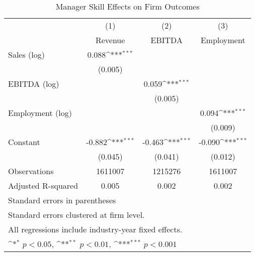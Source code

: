 \begin{table}[htbp]\centering
\def\sym#1{\ifmmode^{#1}\else\(^{#1}\)\fi}
\caption{Manager Skill Effects on Firm Outcomes}
\begin{tabular}{l*{3}{c}}
\toprule
                    &\multicolumn{1}{c}{(1)}&\multicolumn{1}{c}{(2)}&\multicolumn{1}{c}{(3)}\\
                    &\multicolumn{1}{c}{Revenue}&\multicolumn{1}{c}{EBITDA}&\multicolumn{1}{c}{Employment}\\
\midrule
Sales (log)         &       0.088\sym{***}&                     &                     \\
                    &     (0.005)         &                     &                     \\
\addlinespace
EBITDA (log)        &                     &       0.059\sym{***}&                     \\
                    &                     &     (0.005)         &                     \\
\addlinespace
Employment (log)    &                     &                     &       0.094\sym{***}\\
                    &                     &                     &     (0.009)         \\
\addlinespace
Constant            &      -0.882\sym{***}&      -0.463\sym{***}&      -0.090\sym{***}\\
                    &     (0.045)         &     (0.041)         &     (0.012)         \\
\midrule
Observations        &     1611007         &     1215276         &     1611007         \\
Adjusted R-squared  &       0.005         &       0.002         &       0.002         \\
\bottomrule
\multicolumn{4}{l}{\footnotesize Standard errors in parentheses}\\
\multicolumn{4}{l}{\footnotesize Standard errors clustered at firm level.}\\
\multicolumn{4}{l}{\footnotesize All regressions include industry-year fixed effects.}\\
\multicolumn{4}{l}{\footnotesize \sym{*} \(p<0.05\), \sym{**} \(p<0.01\), \sym{***} \(p<0.001\)}\\
\end{tabular}
\end{table}
